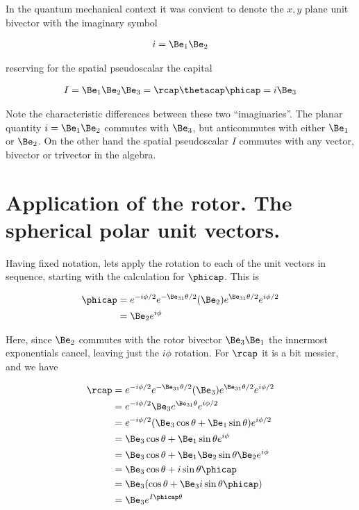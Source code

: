 In the quantum mechanical context it was convient to denote the $x,y$ plane unit bivector with the imaginary symbol

\begin{align}\label{eqn:sphericalPolarUnit:foo1}
i = \Be_1 \Be_2
\end{align}

reserving for the spatial pseudoscalar the capital

\begin{align}\label{eqn:sphericalPolarUnit:foo2}
I = \Be_1 \Be_2 \Be_3 = \rcap \thetacap \phicap = i \Be_3
\end{align}

Note the characteristic differences between these two ``imaginaries''.  The planar quantity $i = \Be_1 \Be_2$ commutes with $\Be_3$, but anticommutes with either $\Be_1$ or $\Be_2$.  On the other hand the spatial pseudoscalar $I$ commutes with any vector, bivector or trivector in the algebra.

\section{Application of the rotor.  The spherical polar unit vectors.}

Having fixed notation, lets apply the rotation to each of the unit vectors in sequence, starting with the calculation for $\phicap$.  This is

\begin{align*}
\phicap 
&= e^{-i \phi/2} e^{-\Be_{31}\theta/2} (\Be_2) e^{\Be_{31}\theta/2} e^{i\phi/2} \\
&= \Be_2 e^{i\phi} 
\end{align*}

Here, since $\Be_2$ commutes with the rotor bivector $\Be_3 \Be_1$ the innermost exponentials cancel, leaving just the $i\phi$ rotation.  For $\rcap$ it is a bit messier, and we have

\begin{align*}
\rcap 
&= e^{-i \phi/2} e^{-\Be_{31}\theta/2} (\Be_3) e^{\Be_{31}\theta/2} e^{i\phi/2} \\
&= e^{-i \phi/2} \Be_3 e^{\Be_{31}\theta} e^{i\phi/2} \\
&= e^{-i \phi/2} (\Be_3 \cos\theta + \Be_1 \sin\theta) e^{i\phi/2} \\
&= \Be_3 \cos\theta + \Be_1 \sin\theta e^{i\phi} \\
&= \Be_3 \cos\theta + \Be_1 \Be_2 \sin\theta \Be_2 e^{i\phi} \\
&= \Be_3 \cos\theta + i \sin\theta \phicap \\
&= \Be_3 (\cos\theta + \Be_3 i \sin\theta \phicap) \\
&= \Be_3 e^{I\phicap\theta} 
\end{align*}

